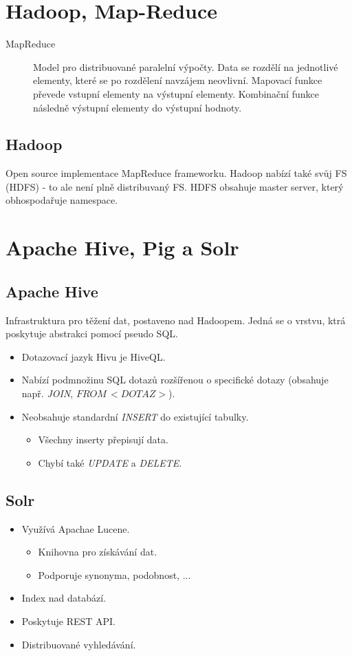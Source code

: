 \documentclass{article}
\begin{document}
\section{Hadoop, Map-Reduce}
  \begin{description}
    \item[MapReduce] Model pro distribuované paralelní výpočty. Data se rozdělí na jednotlivé elementy, které se po rozdělení navzájem neovlivní.
    Mapovací funkce převede vstupní elementy na výstupní elementy.
    Kombinační funkce následně výstupní elementy do výstupní hodnoty.
  \end{description}

  \subsection{Hadoop}
    Open source implementace MapReduce frameworku. Hadoop nabízí také svůj FS (HDFS) - to ale není plně distribuvaný FS. HDFS obsahuje master server, který obhospodařuje namespace.

\section{Apache Hive, Pig a Solr}
  \subsection{Apache Hive}
    Infrastruktura pro těžení dat, postaveno nad Hadoopem. Jedná se o vrstvu, ktrá poskytuje abstrakci pomocí pseudo SQL.

    \begin{itemize}
      \item Dotazovací jazyk Hivu je HiveQL.
      \item Nabízí podmnožinu SQL dotazů rozšířenou o specifické dotazy (obsahuje např. \emph{JOIN}, $FROM \, <DOTAZ>$).
      \item Neobsahuje standardní \emph{INSERT} do existující tabulky.
        \begin{itemize}
          \item Všechny inserty přepisují data.
          \item Chybí také \emph{UPDATE} a \emph{DELETE}.
        \end{itemize}
    \end{itemize}

  \subsection{Solr}
    \begin{itemize}
      \item Využívá Apachae Lucene.
        \begin{itemize}
          \item Knihovna pro získávání dat.
          \item Podporuje synonyma, podobnost, ...
        \end{itemize}
      \item Index nad databází.
      \item Poskytuje REST API.
      \item Distribuované vyhledávání.
    \end{itemize}
\end{document}
